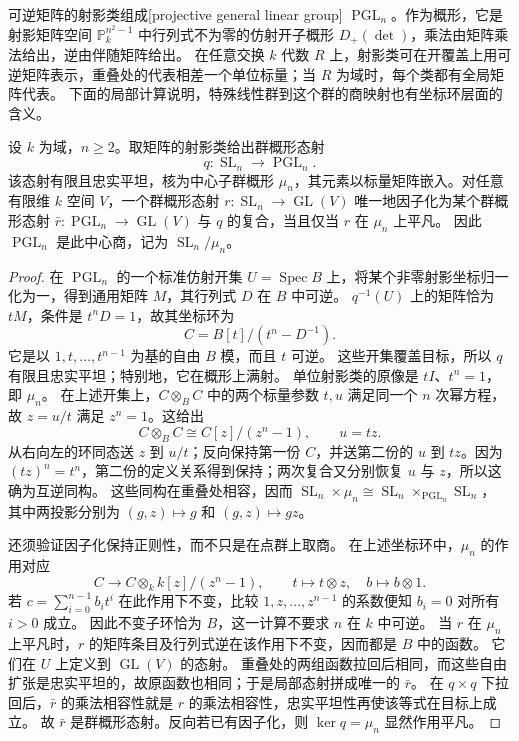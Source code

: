 \ProseParagraphBreak
可逆矩阵的射影类组成[projective general linear group] \(\operatorname{PGL}_n\)。作为概形，它是射影矩阵空间 \(\mathbb P_k^{n^2-1}\) 中行列式不为零的仿射开子概形 \(D_+(\det)\)，乘法由矩阵乘法给出，逆由伴随矩阵给出。 在任意交换 \(k\) 代数 \(R\) 上，射影类可在开覆盖上用可逆矩阵表示，重叠处的代表相差一个单位标量；当 \(R\) 为域时，每个类都有全局矩阵代表。 下面的局部计算说明，特殊线性群到这个群的商映射也有坐标环层面的含义。
\begin{proposition}\label{b5:prop:special-projective-quotient}
	设 \(k\) 为域，\(n\ge2\)。取矩阵的射影类给出群概形态射
	\[
		q:\operatorname{SL}_n\longrightarrow\operatorname{PGL}_n.
	\]
	该态射有限且忠实平坦，核为中心子群概形 \(\mu_n\)，其元素以标量矩阵嵌入。对任意有限维 \(k\) 空间 \(V\)，一个群概形态射 \(r:\operatorname{SL}_n\to\operatorname{GL}(V)\) 唯一地因子化为某个群概形态射 \(\bar r:\operatorname{PGL}_n\to\operatorname{GL}(V)\) 与 \(q\) 的复合，当且仅当 \(r\) 在 \(\mu_n\) 上平凡。 因此 \(\operatorname{PGL}_n\) 是此中心商，记为 \(\operatorname{SL}_n/\mu_n\)。
\end{proposition}
\begin{proof}
	在 \(\operatorname{PGL}_n\) 的一个标准仿射开集 \(U=\operatorname{Spec}B\) 上，将某个非零射影坐标归一化为一，得到通用矩阵 \(M\)，其行列式 \(D\) 在 \(B\) 中可逆。 \(q^{-1}(U)\) 上的矩阵恰为 \(tM\)，条件是 \(t^nD=1\)，故其坐标环为
	\[
		C=B[t]/(t^n-D^{-1}).
	\]
	它是以 \(1,t,\ldots,t^{n-1}\) 为基的自由 \(B\) 模，而且 \(t\) 可逆。 这些开集覆盖目标，所以 \(q\) 有限且忠实平坦；特别地，它在概形上满射。 单位射影类的原像是 \(tI\)、\(t^n=1\)，即 \(\mu_n\)。 在上述开集上，\(C\otimes_BC\) 中的两个标量参数 \(t,u\) 满足同一个 \(n\) 次幂方程，故 \(z=u/t\) 满足 \(z^n=1\)。这给出
	\[
		C\otimes_BC\cong C[z]/(z^n-1),\qquad u=tz.
	\]
	从右向左的环同态送 \(z\) 到 \(u/t\)；反向保持第一份 \(C\)，并送第二份的 \(u\) 到 \(tz\)。因为 \((tz)^n=t^n\)，第二份的定义关系得到保持；两次复合又分别恢复 \(u\) 与 \(z\)，所以这确为互逆同构。 这些同构在重叠处相容，因而 \(\operatorname{SL}_n\times\mu_n\cong \operatorname{SL}_n\times_{\operatorname{PGL}_n}\operatorname{SL}_n\)， 其中两投影分别为 \((g,z)\mapsto g\) 和 \((g,z)\mapsto gz\)。

	还须验证因子化保持正则性，而不只是在点群上取商。 在上述坐标环中，\(\mu_n\) 的作用对应
	\[
		C\longrightarrow C\otimes_k k[z]/(z^n-1),\qquad t\longmapsto t\otimes z,\quad b\longmapsto b\otimes1.
	\]
	若 \(c=\sum_{i=0}^{n-1}b_it^i\) 在此作用下不变，比较 \(1,z,\ldots,z^{n-1}\) 的系数便知 \(b_i=0\) 对所有 \(i>0\) 成立。 因此不变子环恰为 \(B\)，这一计算不要求 \(n\) 在 \(k\) 中可逆。 当 \(r\) 在 \(\mu_n\) 上平凡时，\(r\) 的矩阵条目及行列式逆在该作用下不变，因而都是 \(B\) 中的函数。 它们在 \(U\) 上定义到 \(\operatorname{GL}(V)\) 的态射。 重叠处的两组函数拉回后相同，而这些自由扩张是忠实平坦的，故原函数也相同；于是局部态射拼成唯一的 \(\bar r\)。 在 \(q\times q\) 下拉回后，\(\bar r\) 的乘法相容性就是 \(r\) 的乘法相容性，忠实平坦性再使该等式在目标上成立。 故 \(\bar r\) 是群概形态射。反向若已有因子化，则 \(\ker q=\mu_n\) 显然作用平凡。
\end{proof}
